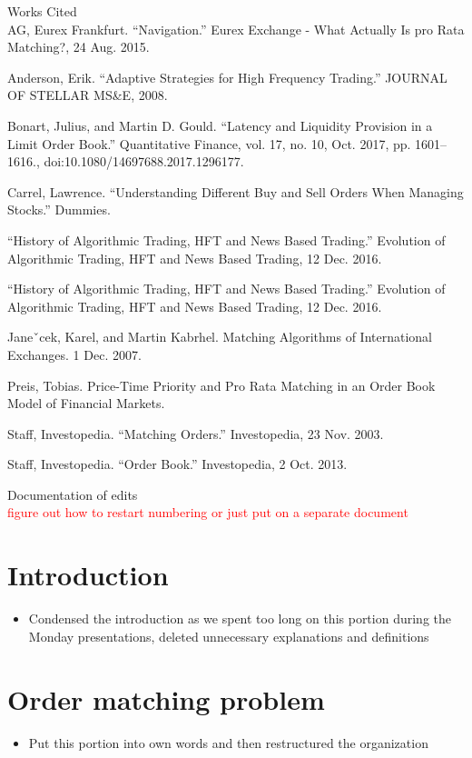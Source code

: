 \documentclass{article}
\newcommand{\todo}{\textcolor{red}}
\begin{document}
\begin{hangparas}{.25in}{1}

Works Cited
\\ 

AG, Eurex Frankfurt. “Navigation.” Eurex Exchange - What Actually Is pro Rata Matching?, 24 Aug. 2015.

Anderson, Erik. “Adaptive Strategies for High Frequency Trading.” JOURNAL OF STELLAR MS&E, 2008.

Bonart, Julius, and Martin D. Gould. “Latency and Liquidity Provision in a Limit Order Book.” Quantitative Finance, vol. 17, no. 10, Oct. 2017, pp. 1601–1616., doi:10.1080/14697688.2017.1296177.

Carrel, Lawrence. “Understanding Different Buy and Sell Orders When Managing Stocks.” Dummies.

“History of Algorithmic Trading, HFT and News Based Trading.” Evolution of Algorithmic Trading, HFT and News Based Trading, 12 Dec. 2016.

“History of Algorithmic Trading, HFT and News Based Trading.” Evolution of Algorithmic Trading, HFT and News Based Trading, 12 Dec. 2016.

Janeˇcek, Karel, and Martin Kabrhel. Matching Algorithms of International Exchanges. 1 Dec. 2007.

Preis, Tobias. Price-Time Priority and Pro Rata Matching in an Order Book Model of Financial Markets.

Staff, Investopedia. “Matching Orders.” Investopedia, 23 Nov. 2003.

Staff, Investopedia. “Order Book.” Investopedia, 2 Oct. 2013.
\end{hangparas}

\newpage

Documentation of edits \\
\todo{figure out how to restart numbering or just put on a separate document}

\section{Introduction}
\begin{itemize}

  \item Condensed the introduction as we spent too long on this portion during the Monday presentations, deleted unnecessary explanations and definitions
  
\end{itemize}
\section{Order matching problem}
\begin{itemize}

  \item Put this portion into own words and then restructured the organization 
  
\end{itemize}
\end{document}

